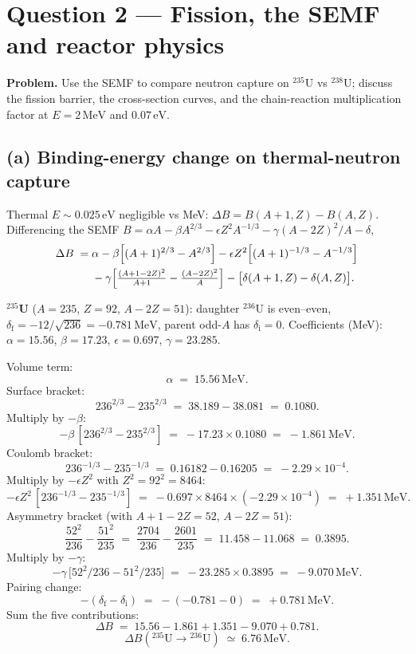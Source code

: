 \documentclass[11pt]{article}
\begin{document}
\section*{Question 2 --- Fission, the SEMF and reactor physics}

\textbf{Problem.} Use the SEMF to compare neutron capture on $^{235}$U vs $^{238}$U; discuss the fission barrier, the cross-section curves, and the chain-reaction multiplication factor at $E=2\,\text{MeV}$ and $0.07\,\text{eV}$.

\subsection*{(a) Binding-energy change on thermal-neutron capture}

Thermal $E\sim 0.025\,\text{eV}$ negligible vs MeV: $\Delta B=B(A+1,Z)-B(A,Z)$. Differencing the SEMF $B=\alpha A-\beta A^{2/3}-\epsilon Z^{2}A^{-1/3}-\gamma(A-2Z)^{2}/A-\delta$,
\begin{align}
\Delta B \;=\;& \alpha-\beta\!\left[(A+1)^{2/3}-A^{2/3}\right]-\epsilon Z^{2}\!\left[(A+1)^{-1/3}-A^{-1/3}\right]\notag\\
&-\gamma\!\left[\tfrac{(A+1-2Z)^{2}}{A+1}-\tfrac{(A-2Z)^{2}}{A}\right]-\bigl[\delta(A+1,Z)-\delta(A,Z)\bigr].
\label{eq:DeltaB-expanded}
\end{align}

\textbf{$^{235}$U} ($A=235$, $Z=92$, $A-2Z=51$): daughter $^{236}$U is even--even, $\delta_\text{f}=-12/\sqrt{236}=-0.781\,\text{MeV}$, parent odd-$A$ has $\delta_\text{i}=0$. Coefficients (MeV): $\alpha=15.56$, $\beta=17.23$, $\epsilon=0.697$, $\gamma=23.285$.

Volume term:
\[
\alpha\;=\;15.56\,\text{MeV}.
\]
Surface bracket:
\[
236^{2/3}-235^{2/3}\;=\;38.189-38.081\;=\;0.1080.
\]
Multiply by $-\beta$:
\[
-\beta\,[236^{2/3}-235^{2/3}]\;=\;-17.23\times 0.1080\;=\;-1.861\,\text{MeV}.
\]
Coulomb bracket:
\[
236^{-1/3}-235^{-1/3}\;=\;0.16182-0.16205\;=\;-2.29\times 10^{-4}.
\]
Multiply by $-\epsilon Z^{2}$ with $Z^{2}=92^{2}=8464$:
\[
-\epsilon Z^{2}\,[236^{-1/3}-235^{-1/3}]\;=\;-0.697\times 8464\times(-2.29\times 10^{-4})\;=\;+1.351\,\text{MeV}.
\]
Asymmetry bracket (with $A+1-2Z=52$, $A-2Z=51$):
\[
\frac{52^{2}}{236}-\frac{51^{2}}{235}\;=\;\frac{2704}{236}-\frac{2601}{235}\;=\;11.458-11.068\;=\;0.3895.
\]
Multiply by $-\gamma$:
\[
-\gamma\,\bigl[52^{2}/236-51^{2}/235\bigr]\;=\;-23.285\times 0.3895\;=\;-9.070\,\text{MeV}.
\]
Pairing change:
\[
-(\delta_\text{f}-\delta_\text{i})\;=\;-(-0.781-0)\;=\;+0.781\,\text{MeV}.
\]
Sum the five contributions:
\[
\Delta B\;=\;15.56-1.861+1.351-9.070+0.781.
\]
\begin{equation}
\Delta B(^{235}\text{U}\to{}^{236}\text{U})\;\simeq\;\boxed{6.76\,\text{MeV}}.
\end{equation}
\end{document}
